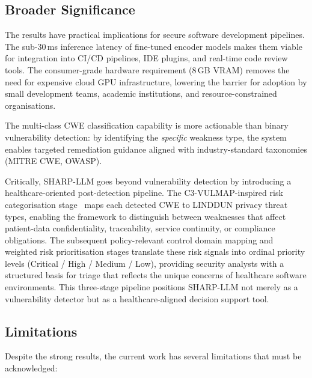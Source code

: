\documentclass[conference]{IEEEtran}
\begin{document}
\subsection{Broader Significance}
\label{sec:significance}

The results have practical implications for secure software development
pipelines.  The sub-30\,ms inference latency of fine-tuned encoder models
makes them viable for integration into CI/CD pipelines, IDE plugins, and
real-time code review tools.  The consumer-grade hardware requirement
(8\,GB VRAM) removes the need for expensive cloud GPU infrastructure,
lowering the barrier for adoption by small development teams, academic
institutions, and resource-constrained organisations.

The multi-class CWE classification capability is more actionable than binary
vulnerability detection: by identifying the \emph{specific} weakness type,
the system enables targeted remediation guidance aligned with
industry-standard taxonomies (MITRE CWE, OWASP).

Critically, SHARP-LLM goes beyond vulnerability detection by introducing a
healthcare-oriented post-detection pipeline.  The C3-VULMAP-inspired risk
categorisation stage~\cite{santos2023c3vulmap} maps each detected CWE to
LINDDUN privacy threat types, enabling the framework to distinguish between
weaknesses that affect patient-data confidentiality, traceability, service
continuity, or compliance obligations.  The subsequent policy-relevant
control domain mapping and weighted risk prioritisation stages translate
these risk signals into ordinal priority levels (Critical / High / Medium /
Low), providing security analysts with a structured basis for triage that
reflects the unique concerns of healthcare software environments.  This
three-stage pipeline positions SHARP-LLM not merely as a vulnerability
detector but as a healthcare-aligned decision support tool.

\subsection{Limitations}
\label{sec:limitations}

Despite the strong results, the current work has several limitations that
must be acknowledged:
\end{document}
